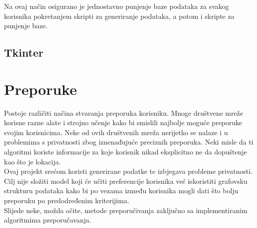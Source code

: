 \documentclass[titlepage, 12pt]{scrartcl}
\begin{document}
Na ovaj način osigurano je jednostavno punjenje baze podataka za svakog korisnika pokretanjem skripti za generiranje podataka, a potom i skripte za punjenje baze.
\subsection{Tkinter}
\newpage

\section{Preporuke}
Postoje različiti načina stvaranja preporuka korisniku. Mnoge društvene mreže korisne razne alate i strojno učenje kako bi smislili najbolje moguće preporuke svojim korisnicima.
Neke od ovih društvenih mreža nerijetko se nalaze i u problemima s privatnosti zbog iznenađujuće preciznih preporuka.
Neki misle da ti algoritmi koriste informacije za koje korisnik nikad eksplicitno ne da dopuštenje kao što je lokacija. \\
Ovaj projekt srećom koristi generirane podatke te izbjegava probleme privatnosti. Cilj nije složiti model koji će učiti preferencije korisnika već iskoristiti grafovsku strukturu podataka kako bi po vezama između korisnika mogli dati što bolju preporuku po predodređenim kriterijima. \\
Slijede neke, možda očite, metode preporučivanja zaključno sa implementiranim algoritmima preporučavanja.
\end{document}
